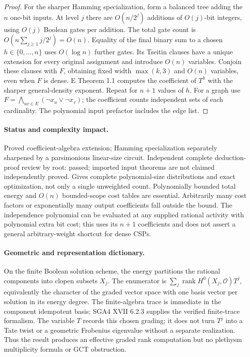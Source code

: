 \begin{proof}
For the sharper Hamming specialization, form a balanced tree adding the $n$ one-bit inputs. At level $j$ there are $O(n/2^j)$ additions of $O(j)$-bit integers, using $O(j)$ Boolean gates per addition. The total gate count is $O(n\sum_{j\geq1}j/2^j)=O(n)$. Equality of the final binary sum to a chosen $h\in\{0,\ldots,n\}$ uses $O(\log n)$ further gates. Its Tseitin clauses have a unique extension for every original assignment and introduce $O(n)$ variables. Conjoin these clauses with $F$, obtaining fixed width $\max(k,3)$ and $O(n)$ variables, even when $F$ is dense. E Theorem 1.1 computes the coefficient of $T^h$ with the sharper general-density exponent. Repeat for $n+1$ values of $h$. For a graph use $F=\bigwedge_{uv\in E}(\neg x_u\vee\neg x_v)$; the coefficient counts independent sets of each cardinality. The polynomial input prefactor includes the edge list.
\end{proof}
\paragraph{Status and complexity impact.}
Proved coefficient-algebra extension; Hamming specialization separately sharpened by a parsimonious linear-size circuit. Independent complete deduction-proof review by root: passed; imported input theorems are not claimed independently proved. Gives complete polynomial-size distributions and exact optimization, not only a single unweighted count. Polynomially bounded total energy and $O(n)$ bounded-scope cost tables are essential. Arbitrarily many cost factors or exponentially many output coefficients fall outside the bound. The independence polynomial can be evaluated at any supplied rational activity with polynomial extra bit cost; this uses its $n+1$ coefficients and does not assert a general arbitrary-weight shortcut for dense CSPs.

\paragraph{Geometric and representation dictionary.}
On the finite Boolean solution scheme, the energy partitions the rational components into clopen subsets $X_j$. The enumerator is $\sum_j\operatorname{rank}H^0(X_j,\mathcal O)T^j$, equivalently the character of the graded vector space with one basis vector per solution in its energy degree. The finite-algebra trace is immediate in the component idempotent basis; SGA4 XVII 6.2.3 supplies the verified finite-trace formalism. The variable $T$ records this chosen grading; it does not turn $T^j$ into a Tate twist or a geometric Frobenius eigenvalue without a separate realization. Thus the result produces an effective graded rank computation but no plethysm multiplicity formula or GCT obstruction.



